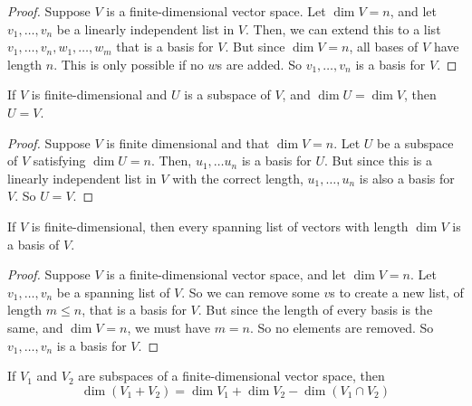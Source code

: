 \begin{proof}
    Suppose $V$ is a finite-dimensional vector space. Let $\dim V = n$, and let $v_1, \dots, v_n$ be a linearly independent list in $V$. Then, we can extend this to a list $v_1, \dots, v_n, w_1, \dots, w_m$ that is a basis for $V$. But since $\dim V = n$, all bases of $V$ have length $n$. This is only possible if no $w$s are added. So $v_1, \dots, v_n$ is a basis for $V$. 
\end{proof}
\begin{theorem}
    If $V$ is finite-dimensional and $U$ is a subspace of $V$, and $\dim U =\dim V$, then $U=V$.
\end{theorem}
\begin{proof}
    Suppose $V$ is finite dimensional and that $\dim V = n$. Let $U$ be a subspace of $V$ satisfying $\dim U = n$. Then, $u_1, \dots u_n$ is a basis for $U$. But since this is a linearly independent list in $V$ with the correct length, $u_1, \dots, u_n$ is also a basis for $V$. So $U=V$.
\end{proof}
\begin{theorem}
    If $V$ is finite-dimensional, then every spanning list of vectors with length $\dim V$ is a basis of $V$.
\end{theorem}   
\begin{proof}
    Suppose $V$ is a finite-dimensional vector space, and let $\dim V = n$. Let $v_1, \dots, v_n$ be a spanning list of $V$. So we can remove some $v$s to create a new list, of length $m\le n$, that is a basis for $V$. But since the length of every basis is the same, and $\dim V=n$, we must have $m=n$. So no elements are removed. So $v_1, \dots, v_n$ is a basis for $V$.
\end{proof}
\begin{theorem} \label{dimension of a sum}
    If $V_1$ and $V_2$ are subspaces of a finite-dimensional vector space, then
    \[ \dim(V_1+V_2) = \dim V_1 + \dim V_2 - \dim(V_1\cap V_2)\]
\end{theorem}
